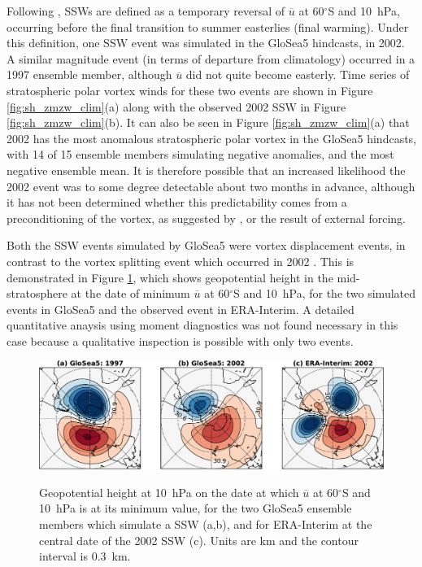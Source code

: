Following \citet{Charlton2007}, SSWs are defined as a temporary reversal of
$\overline{u}$ at 60$^{\circ}$S and 10~hPa, occurring before the final
transition to summer easterlies (final warming). Under this definition, one SSW
event was simulated in the GloSea5 hindcasts, in 2002. A similar magnitude event
(in terms of departure from climatology) occurred in a 1997 ensemble member,
although $\overline{u}$ did not quite become easterly. Time series of
stratospheric polar vortex winds for these two events are shown in Figure
\ref{fig:sh_zmzw_clim}(a) along with the observed 2002 SSW in Figure
\ref{fig:sh_zmzw_clim}(b). It can also be seen in Figure
\ref{fig:sh_zmzw_clim}(a) that 2002 has the most anomalous stratospheric polar
vortex in the GloSea5 hindcasts, with 14 of 15 ensemble members simulating
negative anomalies, and the most negative ensemble mean. It is therefore
possible that an increased likelihood the 2002 event was to some degree
detectable about two months in advance, although it has not been determined
whether this predictability comes from a preconditioning of the vortex, as
suggested by \citet{Scaife2005c}, or the result of external forcing.

Both the SSW events simulated by GloSea5 were vortex displacement events, in
contrast to the vortex splitting event which occurred in 2002
\citep{Charlton2005a}. This is demonstrated in Figure \ref{fig:sh_ssws}, which
shows geopotential height in the mid-stratosphere at the date of minimum
$\overline{u}$ at 60$^{\circ}$S and 10~hPa, for the two simulated events in
GloSea5 and the observed event in ERA-Interim. A detailed quantitative anaysis
using moment diagnostics was not found necessary in this case because a
qualitative inspection is possible with only two events.

\begin{figure}[t]
  \noindent\includegraphics[width=\textwidth,angle=0]{figures/chapter-seasonal/ssws_crop.pdf}\\
  \caption[Comparison of GloSea5 and observed SSWs.]{Geopotential height at
    10~hPa on the date at which $\overline{u}$ at 60$^{\circ}$S and 10~hPa is at
    its minimum value, for the two GloSea5 ensemble members which simulate a SSW
    (a,b), and for ERA-Interim at the central date of the 2002 SSW (c). Units
    are km and the contour interval is 0.3~km.}\label{fig:sh_ssws}
\end{figure}

